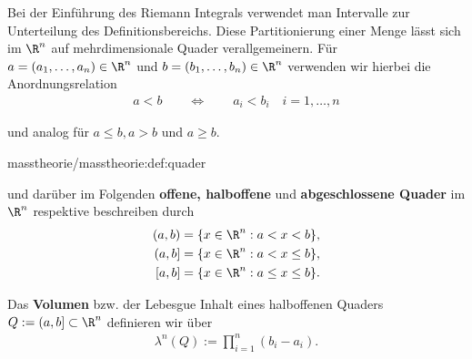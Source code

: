 \documentclass[letterpaper,10pt,german]{jupyterBook}
\begin{document}
\par
Bei der Einführung des Riemann Integrals verwendet man Intervalle zur Unterteilung des Definitionsbereichs.
Diese Partitionierung einer Menge lässt sich im \(\R^n\) auf mehrdimensionale Quader verallgemeinern. Für \(a = (a_1,\ldots,a_n) \in \R^n\) und \(b = (b_1,\ldots,b_n) \in \R^n\) verwenden wir hierbei die Anordnungsrelation
\begin{align*}
a < b \qquad \Leftrightarrow \qquad a_i < b_i \quad i=1,\ldots,n
\end{align*}
\par
und analog für \(a \leq b, a > b\) und \(a \geq b\).
\begin{definition}{}{masstheorie/masstheorie:def:quader}



\par
und darüber im Folgenden \textbf{offene, halboffene} und \textbf{abgeschlossene Quader} im \(\R^n\) respektive beschreiben durch
\begin{align*}
(a,b) &= \lbrace x \in \R^n : a < x < b \rbrace,\\
(a,b] &= \lbrace x \in \R^n : a < x \leq b \rbrace,\\
[a,b] &= \lbrace x \in \R^n : a \leq x \leq b \rbrace.
\end{align*}
\par
Das \textbf{Volumen} bzw. der Lebesgue Inhalt eines halboffenen Quaders \(Q := (a,b] \subset \R^n\) definieren wir über
\begin{align*}
\lambda^n(Q) := \prod_{i=1}^n (b_i - a_i).
\end{align*}\end{definition}
\end{document}
